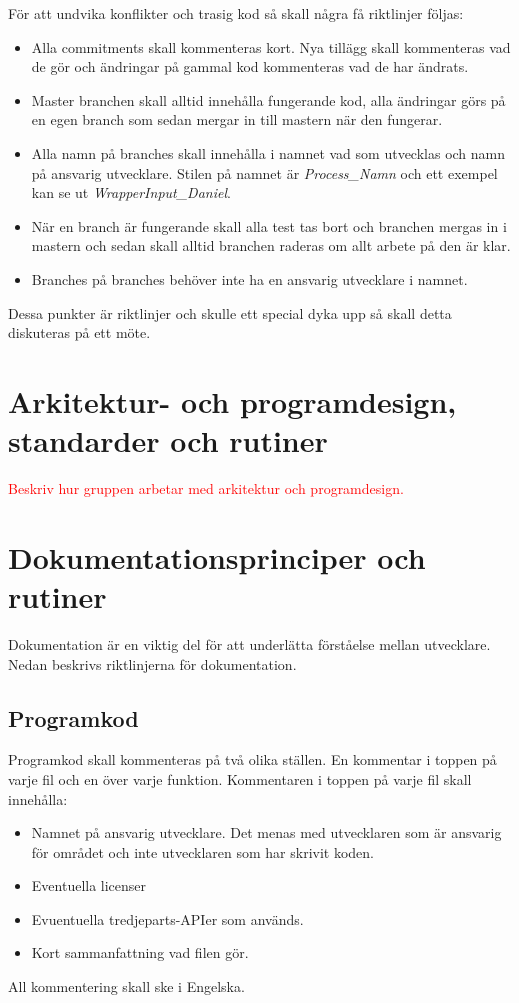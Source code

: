 \documentclass[a4paper,12pt,oneside,final]{extbook}
\begin{document}
För att undvika konflikter och trasig kod så skall några få riktlinjer följas:
\begin{itemize}
	\item Alla commitments skall kommenteras kort. Nya tillägg skall kommenteras vad de gör och ändringar på gammal kod kommenteras vad de har ändrats. 
	\item Master branchen skall alltid innehålla fungerande kod, alla ändringar görs på en egen branch som sedan mergar in till mastern när den fungerar.
	\item Alla namn på branches skall innehålla i namnet vad som utvecklas och namn på ansvarig utvecklare. Stilen på namnet är \textit{Process\_Namn} och ett exempel kan se ut \textit{WrapperInput\_Daniel}.
	\item När en branch är fungerande skall alla test tas bort och branchen mergas in i mastern och sedan skall alltid branchen raderas om allt arbete på den är klar.
	\item Branches på branches behöver inte ha en ansvarig utvecklare i namnet. 
\end{itemize}

Dessa punkter är riktlinjer och skulle ett special dyka upp så skall detta diskuteras på ett möte.


\section{Arkitektur- och programdesign, standarder och rutiner}

\textcolor{red}{Beskriv hur gruppen arbetar med arkitektur och programdesign.}
\section{Dokumentationsprinciper och rutiner}
Dokumentation är en viktig del för att underlätta förståelse mellan utvecklare. Nedan beskrivs riktlinjerna för dokumentation.

\subsection{Programkod}
Programkod skall kommenteras på två olika ställen. En kommentar i toppen på varje fil och en över varje funktion. Kommentaren i toppen på varje fil skall innehålla:
\begin{itemize}
	\item Namnet på ansvarig utvecklare. Det menas med utvecklaren som är ansvarig för området och inte utvecklaren som har skrivit koden.
	\item Eventuella licenser
	\item Evuentuella tredjeparts-APIer som används.
	\item Kort sammanfattning vad filen gör.
\end{itemize}
All kommentering skall ske i Engelska.
\end{document}
